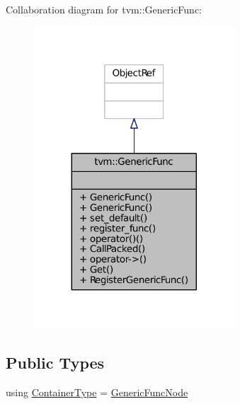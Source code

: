 Collaboration diagram for tvm\+:\+:Generic\+Func\+:
\nopagebreak
\begin{figure}[H]
\begin{center}
\leavevmode
\includegraphics[width=212pt]{classtvm_1_1GenericFunc__coll__graph}
\end{center}
\end{figure}
\subsection*{Public Types}
\begin{DoxyCompactItemize}
\item 
using \hyperlink{classtvm_1_1GenericFunc_adb9e6551f7f52018f1641198bd08574f}{Container\+Type} = \hyperlink{classtvm_1_1GenericFuncNode}{Generic\+Func\+Node}
\end{DoxyCompactItemize}
